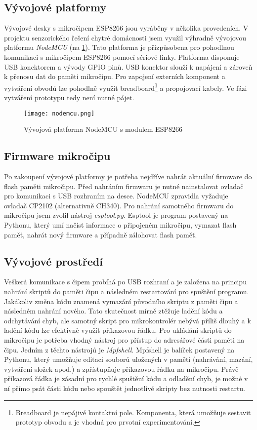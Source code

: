 \subsection*{Vývojové platformy}
Vývojové desky s mikročipem ESP8266 jsou vyráběny v několika provedeních. V projektu senzorického řešení chytré domácnosti jsem využil výhradně vývojovou platformu \textit{NodeMCU} (na \cref{fig:nodemcu}). Tato platforma je přizpůsobena pro pohodlnou komunikaci s mikročipem ESP8266 pomocí sériové linky. Platforma disponuje USB konektorem a vývody GPIO pinů. USB konektor slouží k napájení a zároveň k přenosu dat do paměti mikročipu. Pro zapojení externích komponent a vytváření obvodů lze pohodlně využít breadboard\footnote{Breadboard je nepájivé kontaktní pole. Komponenta, která umožňuje sestavit prototyp obvodu a je vhodná pro prvotní experimentování.} a propojovací kabely. Ve fázi vytváření prototypu tedy není nutné pájet.

\begin{figure}[H]
  \centering
  \texttt{[image: nodemcu.png]}
  \caption{Vývojová platforma NodeMCU s modulem ESP8266}
  \label{fig:nodemcu}
\end{figure}

\subsection*{Firmware mikročipu}
Po zakoupení vývojové platformy je potřeba nejdříve nahrát aktuální \mbox{firmware} do flash paměti mikročipu. Před nahráním firmwaru je nutné nainstalovat ovladač pro komunikaci s USB rozhraním na desce. NodeMCU zpravidla vyžaduje ovladač CP2102 (alternativně CH340). Pro nahrání samotného firmwaru do mikročipu jsem zvolil nástroj \textit{esptool.py}. \cite{esptool.py} Esptool je program postavený na Pythonu, který umí načíst informace o připojeném mikročipu, vymazat flash paměť, nahrát nový firmware a případně zálohovat flash paměť.

\subsection*{Vývojové prostředí}
Veškerá komunikace s čipem probíhá po USB rozhraní a je založena na principu nahrání skriptů do paměti čipu a následném restartování pro spuštění programu. Jakákoliv změna kódu znamená vymazání původního skriptu z paměti čipu a následném nahrání nového. Tato skutečnost mírně ztěžuje ladění kódu a odchytávání chyb, ale samotný skript pro mikrokontrolér nebývá příliš dlouhý a k ladění kódu lze efektivně využít příkazovou řádku. Pro ukládání skriptů do mikročipu je potřeba vhodný nástroj pro přístup do adresářové části paměti na čipu. Jedním z těchto nástrojů je \textit{Mpfshell}.  \cite{mpfshell} Mpfshell je balíček postavený na Pythonu, který umožňuje editaci souborů uložených v paměti (nahrávání, mazání, vytváření složek apod.) a zpřístupňuje příkazovou řádku na mikročipu. Právě příkazová řádka je zásadní pro rychlé spuštění kódu a odladění chyb, je možné v ní přímo psát části kódu nebo spouštět jednotlivé skripty bez nutnosti restartu.

